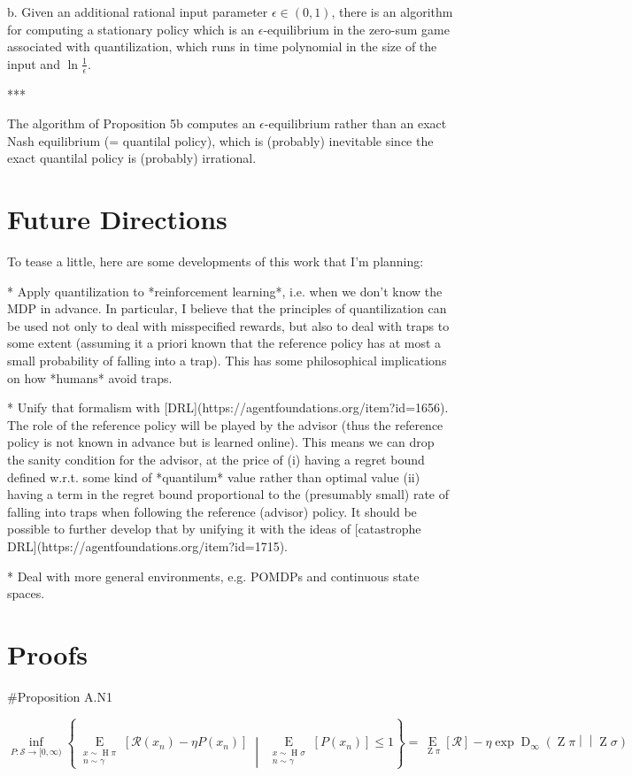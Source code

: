 \documentclass[a4paper]{article}
\newcommand{\AP}[1]{\left(#1\right)}
\newcommand{\AB}[1]{\left[#1\right]}
\newcommand{\ACM}[2]{\left\{#1\;\middle\vert\;#2\right\}}
\newcommand{\Ea}[2]{\underset{#1}{\operatorname{E}}\AB{#2}}
\newcommand{\RD}[3]{\operatorname{D}_{#1}\AP{#2\middle\vert\middle\vert#3}}
\newcommand{\St}{\mathcal{S}}
\newcommand{\R}{\mathcal{R}}
\newcommand{\Pe}{P}
\DeclareMathOperator{\Hi}{H}
\DeclareMathOperator{\Z}{Z}
\begin{document}
b. Given an additional rational input parameter $\epsilon\in(0,1)$, there is an algorithm for computing a stationary policy which is an $\epsilon$-equilibrium in the zero-sum game associated with quantilization, which runs in time polynomial in the size of the input and $\ln\frac{1}{\epsilon}$.

***

The algorithm of Proposition 5b computes an $\epsilon$-equilibrium rather than an exact Nash equilibrium (= quantilal policy), which is (probably) inevitable since the exact quantilal policy is (probably) irrational.

\section{Future Directions}

To tease a little, here are some developments of this work that I'm planning:

* Apply quantilization to *reinforcement learning*, i.e. when we don't know the MDP in advance. In particular, I believe that the principles of quantilization can be used not only to deal with misspecified rewards, but also to deal with traps to some extent (assuming it a priori known that the reference policy has at most a small probability of falling into a trap). This has some philosophical implications on how *humans* avoid traps.

* Unify that formalism with [DRL](https://agentfoundations.org/item?id=1656). The role of the reference policy will be played by the advisor (thus the reference policy is not known in advance but is learned online). This means we can drop the sanity condition for the advisor, at the price of (i) having a regret bound defined w.r.t. some kind of *quantilum* value rather than optimal value (ii) having a term in the regret bound proportional to the (presumably small) rate of falling into traps when following the reference (advisor) policy. It should be possible to further develop that by unifying it with the ideas of [catastrophe DRL](https://agentfoundations.org/item?id=1715).

* Deal with more general environments, e.g. POMDPs and continuous state spaces.

\section{Proofs}

\#Proposition A.N1

$$\inf_{\Pe:\St\rightarrow[0,\infty)}\ACM{\Ea{\substack{x\sim\Hi{\pi}\\n\sim\gamma}}{\R\AP{x_n}-\eta\Pe\AP{x_n}}}{\Ea{\substack{x\sim\Hi{\sigma}\\n\sim\gamma}}{\Pe\AP{x_n}}\leq1}=\Ea{\Z{\pi}}{\R}-\eta \exp{\RD{\infty}{\Z{\pi}}{\Z{\sigma}}}$$
\end{document}
